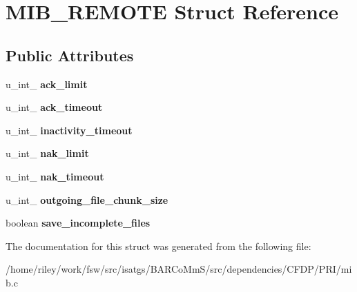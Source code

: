 \hypertarget{struct_m_i_b___r_e_m_o_t_e}{}\section{M\+I\+B\+\_\+\+R\+E\+M\+O\+TE Struct Reference}
\label{struct_m_i_b___r_e_m_o_t_e}
\subsection*{Public Attributes}
\begin{DoxyCompactItemize}
\item 
u\+\_\+int\+\_ {\bfseries ack\+\_\+limit}\hypertarget{struct_m_i_b___r_e_m_o_t_e_ab916fe8e94e822dbf35ad96e39e34814}{}\label{struct_m_i_b___r_e_m_o_t_e_ab916fe8e94e822dbf35ad96e39e34814}

\item 
u\+\_\+int\+\_ {\bfseries ack\+\_\+timeout}\hypertarget{struct_m_i_b___r_e_m_o_t_e_a83cd675ea83beabf777aabdb839c5077}{}\label{struct_m_i_b___r_e_m_o_t_e_a83cd675ea83beabf777aabdb839c5077}

\item 
u\+\_\+int\+\_ {\bfseries inactivity\+\_\+timeout}\hypertarget{struct_m_i_b___r_e_m_o_t_e_a4ec02fe58abf86cd3d9c20e922161445}{}\label{struct_m_i_b___r_e_m_o_t_e_a4ec02fe58abf86cd3d9c20e922161445}

\item 
u\+\_\+int\+\_ {\bfseries nak\+\_\+limit}\hypertarget{struct_m_i_b___r_e_m_o_t_e_a1436d945c1948dadbc8a2cb261028466}{}\label{struct_m_i_b___r_e_m_o_t_e_a1436d945c1948dadbc8a2cb261028466}

\item 
u\+\_\+int\+\_ {\bfseries nak\+\_\+timeout}\hypertarget{struct_m_i_b___r_e_m_o_t_e_a7484587bfb6f523e69dd66bd52dec16e}{}\label{struct_m_i_b___r_e_m_o_t_e_a7484587bfb6f523e69dd66bd52dec16e}

\item 
u\+\_\+int\+\_ {\bfseries outgoing\+\_\+file\+\_\+chunk\+\_\+size}\hypertarget{struct_m_i_b___r_e_m_o_t_e_af30900d9c5edd454a7d604dd648c9949}{}\label{struct_m_i_b___r_e_m_o_t_e_af30900d9c5edd454a7d604dd648c9949}

\item 
boolean {\bfseries save\+\_\+incomplete\+\_\+files}\hypertarget{struct_m_i_b___r_e_m_o_t_e_a34f829c726d85f79f761308d32f97aa4}{}\label{struct_m_i_b___r_e_m_o_t_e_a34f829c726d85f79f761308d32f97aa4}

\end{DoxyCompactItemize}


The documentation for this struct was generated from the following file\+:\begin{DoxyCompactItemize}
\item 
/home/riley/work/fsw/src/isatgs/\+B\+A\+R\+Co\+Mm\+S/src/dependencies/\+C\+F\+D\+P/\+P\+R\+I/mib.\+c\end{DoxyCompactItemize}
